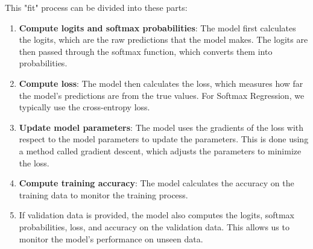 \documentclass{article}
\begin{document}
This "fit" process can be divided into these parts:
\begin{enumerate}
    \item \textbf{Compute logits and softmax probabilities}: The model first calculates the logits, which are the raw predictions that the model makes. The logits are then passed through the softmax function, which converts them into probabilities.
    \item \textbf{Compute loss}: The model then calculates the loss, which measures how far the model's predictions are from the true values. For Softmax Regression, we typically use the cross-entropy loss.
    \item \textbf{Update model parameters}: The model uses the gradients of the loss with respect to the model parameters to update the parameters. This is done using a method called gradient descent, which adjusts the parameters to minimize the loss.
    \item \textbf{Compute training accuracy}: The model calculates the accuracy on the training data to monitor the training process.
    \item If validation data is provided, the model also computes the logits, softmax probabilities, loss, and accuracy on the validation data. This allows us to monitor the model's performance on unseen data.
\end{enumerate}
\end{document}
